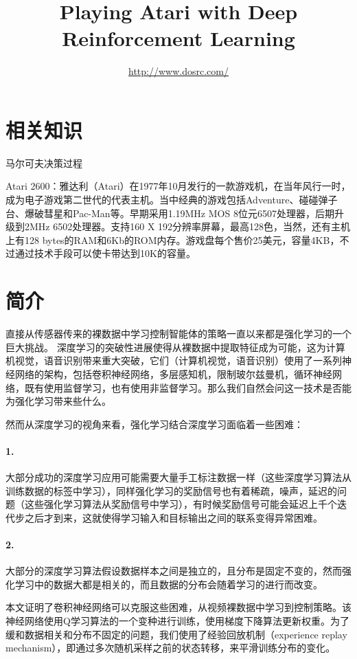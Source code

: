 \documentclass{article} %
\title{Playing Atari with Deep Reinforcement Learning}
\author{
 \url{http://www.dosrc.com/}
}
\begin{document}
\begin{CJK*}{UTF8}{gkai}

\maketitle

\section{相关知识}
马尔可夫决策过程

Atari 2600：雅达利（Atari）在1977年10月发行的一款游戏机，在当年风行一时，成为电子游戏第二世代的代表主机。当中经典的游戏包括Adventure、碰碰弹子台、爆破彗星和Pac-Man等。早期采用1.19MHz MOS 8位元6507处理器，后期升级到2MHz 6502处理器。支持160 X 192分辨率屏幕，最高128色，当然，还有主机上有128 bytes的RAM和6Kb的ROM内存。游戏盘每个售价25美元，容量4KB，不过通过技术手段可以使卡带达到10K的容量。

\section{简介}
直接从传感器传来的裸数据中学习控制智能体的策略一直以来都是强化学习的一个巨大挑战。
深度学习的突破性进展使得从裸数据中提取特征成为可能，这为计算机视觉，语音识别带来重大突破，它们（计算机视觉，语音识别）使用了一系列神经网络的架构，包括卷积神经网络，多层感知机，限制玻尔兹曼机，循环神经网络，既有使用监督学习，也有使用非监督学习。那么我们自然会问这一技术是否能为强化学习带来些什么。

然而从深度学习的视角来看，强化学习结合深度学习面临着一些困难：

\paragraph{1.}大部分成功的深度学习应用可能需要大量手工标注数据一样（这些深度学习算法从训练数据的标签中学习），同样强化学习的奖励信号也有着稀疏，噪声，延迟的问题（这些强化学习算法从奖励信号中学习），有时候奖励信号可能会延迟上千个迭代步之后才到来，这就使得学习输入和目标输出之间的联系变得异常困难。

\paragraph{2.}大部分的深度学习算法假设数据样本之间是独立的，且分布是固定不变的，然而强化学习中的数据大都是相关的，而且数据的分布会随着学习的进行而改变。

本文证明了卷积神经网络可以克服这些困难，从视频裸数据中学习到控制策略。该神经网络使用Q学习算法的一个变种进行训练，使用梯度下降算法更新权重。为了缓和数据相关和分布不固定的问题，我们使用了经验回放机制（experience replay mechanism），即通过多次随机采样之前的状态转移，来平滑训练分布的变化。


\end{CJK*}
\end{document}
